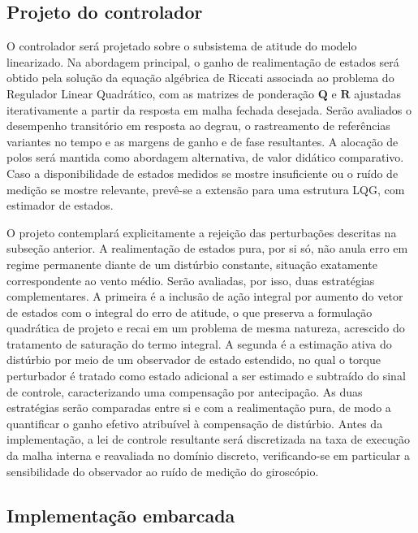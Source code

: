 \documentclass[12pt,a4paper]{article}
\begin{document}
\subsection{Projeto do controlador}

O controlador será projetado sobre o subsistema de atitude do modelo linearizado.
Na abordagem principal, o ganho de realimentação de estados será obtido pela solução
da equação algébrica de Riccati associada ao problema do Regulador Linear
Quadrático, com as matrizes de ponderação $\mathbf{Q}$ e $\mathbf{R}$ ajustadas
iterativamente a partir da resposta em malha fechada desejada. Serão avaliados o
desempenho transitório em resposta ao degrau, o rastreamento de referências variantes
no tempo e as margens de ganho e de fase resultantes. A alocação de polos será
mantida como abordagem alternativa, de valor didático comparativo. Caso a
disponibilidade de estados medidos se mostre insuficiente ou o ruído de medição se
mostre relevante, prevê-se a extensão para uma estrutura LQG, com estimador de
estados.

O projeto contemplará explicitamente a rejeição das perturbações descritas na
subseção anterior. A realimentação de estados pura, por si só, não anula erro em
regime permanente diante de um distúrbio constante, situação exatamente
correspondente ao vento médio. Serão avaliadas, por isso, duas estratégias
complementares. A primeira é a inclusão de ação integral por aumento do vetor de
estados com o integral do erro de atitude, o que preserva a formulação quadrática de
projeto e recai em um problema de mesma natureza, acrescido do tratamento de
saturação do termo integral. A segunda é a estimação ativa do distúrbio por meio de
um observador de estado estendido, no qual o torque perturbador é tratado como estado
adicional a ser estimado e subtraído do sinal de controle, caracterizando uma
compensação por antecipação. As duas estratégias serão comparadas entre si e com a
realimentação pura, de modo a quantificar o ganho efetivo atribuível à compensação de
distúrbio. Antes da implementação, a lei de controle resultante será discretizada na
taxa de execução da malha interna e reavaliada no domínio discreto, verificando-se em
particular a sensibilidade do observador ao ruído de medição do giroscópio.

\subsection{Implementação embarcada}
\end{document}

